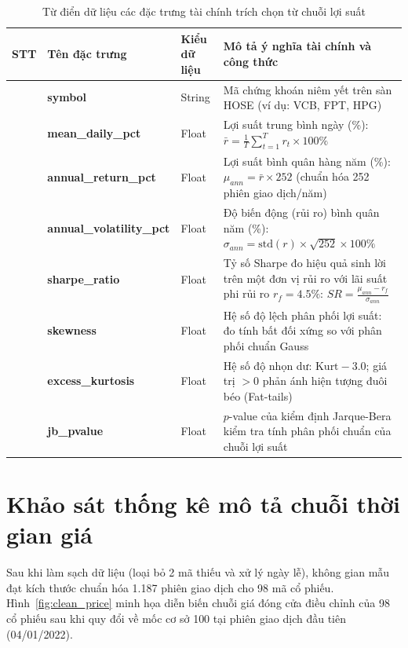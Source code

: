 \documentclass[12pt,a4paper,oneside,openany]{report}
\begin{document}
\begin{table}[H]
  \centering
  \caption{Từ điển dữ liệu các đặc trưng tài chính trích chọn từ chuỗi lợi suất}
  \label{tab:tudien}
  \begin{tabularx}{\textwidth}{|>{\centering\arraybackslash}p{1cm}|p{4.3cm}|>{\centering\arraybackslash}p{1.6cm}|X|}
    \hline
    \rowcolor{black!8}\textbf{STT} & \textbf{Tên đặc trưng} & \textbf{Kiểu dữ liệu} & \textbf{Mô tả ý nghĩa tài chính và công thức} \\ \hline
    1 & \textbf{symbol} & String & Mã chứng khoán niêm yết trên sàn HOSE (ví dụ: VCB, FPT, HPG) \\ \hline
    2 & \textbf{mean\_daily\_pct} & Float & Lợi suất trung bình ngày (\%): $\bar{r} = \frac{1}{T}\sum_{t=1}^T r_t \times 100\%$ \\ \hline
    3 & \textbf{annual\_return\_pct} & Float & Lợi suất bình quân hàng năm (\%): $\mu_{ann} = \bar{r} \times 252$ (chuẩn hóa 252 phiên giao dịch/năm) \\ \hline
    4 & \textbf{annual\_volatility\_pct} & Float & Độ biến động (rủi ro) bình quân năm (\%): $\sigma_{ann} = \text{std}(r) \times \sqrt{252} \times 100\%$ \\ \hline
    5 & \textbf{sharpe\_ratio} & Float & Tỷ số Sharpe đo hiệu quả sinh lời trên một đơn vị rủi ro với lãi suất phi rủi ro $r_f = 4.5\%$: $SR = \frac{\mu_{ann} - r_f}{\sigma_{ann}}$ \\ \hline
    6 & \textbf{skewness} & Float & Hệ số độ lệch phân phối lợi suất: đo tính bất đối xứng so với phân phối chuẩn Gauss \\ \hline
    7 & \textbf{excess\_kurtosis} & Float & Hệ số độ nhọn dư: $\text{Kurt} - 3.0$; giá trị $> 0$ phản ánh hiện tượng đuôi béo (Fat-tails) \\ \hline
    8 & \textbf{jb\_pvalue} & Float & $p$-value của kiểm định Jarque-Bera kiểm tra tính phân phối chuẩn của chuỗi lợi suất \\ \hline
  \end{tabularx}
\end{table}

\section{Khảo sát thống kê mô tả chuỗi thời gian giá}
Sau khi làm sạch dữ liệu (loại bỏ 2 mã thiếu và xử lý ngày lễ), không gian mẫu đạt kích thước chuẩn hóa 1.187 phiên giao dịch cho 98 mã cổ phiếu. Hình~\ref{fig:clean_price} minh họa diễn biến chuỗi giá đóng cửa điều chỉnh của 98 cổ phiếu sau khi quy đổi về mốc cơ sở 100 tại phiên giao dịch đầu tiên (04/01/2022).
\end{document}
